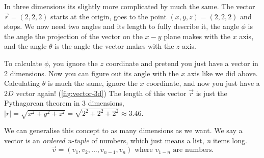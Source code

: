 \documentclass{tufte-book}
\begin{document}
In three dimensions its slightly more complicated by much the same. The vector $\vec{r}=(2,2,2)$ starts at the origin,
goes to the point $(x,y,z)=(2,2,2)$ and stops. We now need two angles and its length to fully describe it, the angle
$\phi$ is the angle the projection of the vector on the $x-y$ plane makes with the $x$ axis, and the angle $\theta$
is the angle the vector makes with the $z$ axis.

To calculate $\phi$, you ignore the $z$ coordinate and pretend you just have a vector in 2 dimensions. Now you can
figure out its angle with the $x$ axis like we did above. Calculating $\theta$ is much the same, ignore the $x$
coordinate, and now you just have a $2D$ vector again! (\cref{fig:vector-3d})
The length of this vector $\vec{r}$ is just the Pythagorean theorem in 3 dimensions,
$|r|=\sqrt{x^2+y^2+z^2}=\sqrt{2^2+2^2+2^2} \approx 3.46$.

\begin{marginfigure}[-6cm]
	\caption{Vectors in $3D$ require 2 angles and a length.}
	\label{fig:vector-3d}
\end{marginfigure}

We can generalise this concept to as many dimensions as we want. We say a vector is an \emph{ordered n-tuple} of
numbers, which just means a list, \emph{n} items long.
\begin{equation*}
	\vec{v}=(v_1,v_2,...,v_{n-1},v_n) \text{ where } v_{1-n} \text{ are numbers.}
\end{equation*}
\end{document}
